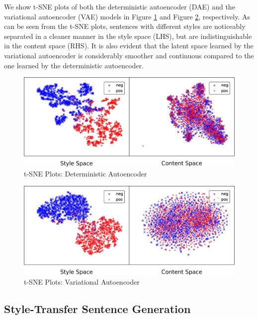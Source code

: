 \documentclass[letterpaper]{article} %
\begin{document}
We show t-SNE plots of both the deterministic autoencoder (DAE) and the variational autoencoder (VAE) models in Figure \ref{fig:dae-tsne} and Figure \ref{fig:vae-tsne}, respectively. As can be seen from the t-SNE plots, sentences with different styles are noticeably separated in a cleaner manner in the style space (LHS), but are indistinguishable in the content space (RHS). It is also evident that the latent space learned by the variational autoencoder is considerably smoother and continuous compared to the one learned by the deterministic autoencoder.


\begin{figure}[ht]
	\captionsetup{justification=centering}
	\includegraphics[width=\linewidth]{dae-latent-spaces}
	\caption{t-SNE Plots: Deterministic Autoencoder}
	\label{fig:dae-tsne}
\end{figure}

\begin{figure}[ht]
	\captionsetup{justification=centering}
	\includegraphics[width=\linewidth]{vae-latent-spaces}
	\caption{t-SNE Plots: Variational Autoencoder}
	\label{fig:vae-tsne}
\end{figure}

\subsection{Style-Transfer Sentence Generation}
\end{document}
